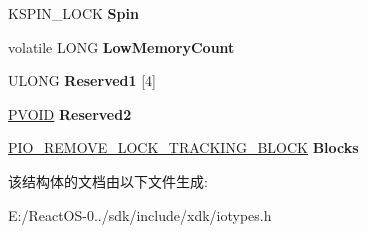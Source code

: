 \begin{DoxyCompactItemize}
K\+S\+P\+I\+N\+\_\+\+L\+O\+CK {\bfseries Spin}
\item 
\mbox{\label{struct___i_o___r_e_m_o_v_e___l_o_c_k___d_b_g___b_l_o_c_k_a7b81f857a8ff9b82ca2162846b7ae178}} 
volatile L\+O\+NG {\bfseries Low\+Memory\+Count}
\item 
\mbox{\label{struct___i_o___r_e_m_o_v_e___l_o_c_k___d_b_g___b_l_o_c_k_a5027df22c09db0927ce28c785580d9db}} 
U\+L\+O\+NG {\bfseries Reserved1} \mbox{[}4\mbox{]}
\item 
\mbox{\label{struct___i_o___r_e_m_o_v_e___l_o_c_k___d_b_g___b_l_o_c_k_acf3d4dfd7ef823d494d36322d419c0b8}} 
\hyperlink{interfacevoid}{P\+V\+O\+ID} {\bfseries Reserved2}
\item 
\mbox{\label{struct___i_o___r_e_m_o_v_e___l_o_c_k___d_b_g___b_l_o_c_k_af0e1339584bcce54393cb2b9eea9f3ab}} 
\hyperlink{struct___i_o___r_e_m_o_v_e___l_o_c_k___t_r_a_c_k_i_n_g___b_l_o_c_k}{P\+I\+O\+\_\+\+R\+E\+M\+O\+V\+E\+\_\+\+L\+O\+C\+K\+\_\+\+T\+R\+A\+C\+K\+I\+N\+G\+\_\+\+B\+L\+O\+CK} {\bfseries Blocks}
\end{DoxyCompactItemize}


该结构体的文档由以下文件生成\+:\begin{DoxyCompactItemize}
\item 
E\+:/\+React\+O\+S-\/0../sdk/include/xdk/iotypes.\+h\end{DoxyCompactItemize}
